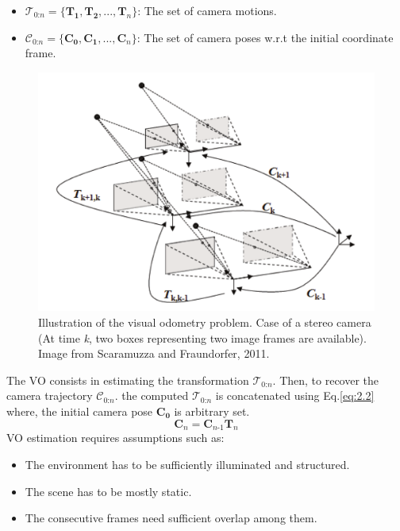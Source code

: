 \documentclass[11pt,openany]{book}
\begin{document}
\begin{itemize}
    \item $\mathcal{T_\textit{0:n}}=\{\mathbf{T_1},\mathbf{T_2},...,\mathbf{T_\textit{n}}\}$: The set of camera motions.
    \item $\mathcal{C_\textit{0:n}}=\{\mathbf{C_0},\mathbf{C_1},...,\mathbf{C_\textit{n}}\}$: The set of camera poses w.r.t the initial coordinate frame.
\end{itemize}
\begin{figure}[h]
    \centering
    \includegraphics[width=\linewidth]{assets/2_2.png}
    \caption{Illustration of the visual odometry problem. Case of a stereo camera (At time \textit{k}, two boxes representing two image frames are available). Image from Scaramuzza and Fraundorfer, 2011.}
    \label{fig:2.2}
\end{figure}
The VO consists in estimating the transformation $\mathcal{T_\textit{0:n}}$. Then, to recover the camera trajectory $\mathcal{C_\textit{0:n}}$. the computed $\mathcal{T_\textit{0:n}}$ is concatenated using Eq.\ref{eq:2.2} where, the initial camera pose $\mathbf{C_0}$ is arbitrary set.
\begin{equation} \label{eq:2.2}
    \mathbf{C_\textit{n}}=\mathbf{C_\textit{n-1}}\mathbf{T_\textit{n}}
\end{equation}
VO estimation requires assumptions such as:
\begin{itemize}
    \item The environment has to be sufficiently illuminated and structured.
    \item The scene has to be mostly static.
    \item The consecutive frames need sufficient overlap among them.
\end{itemize}
\end{document}
